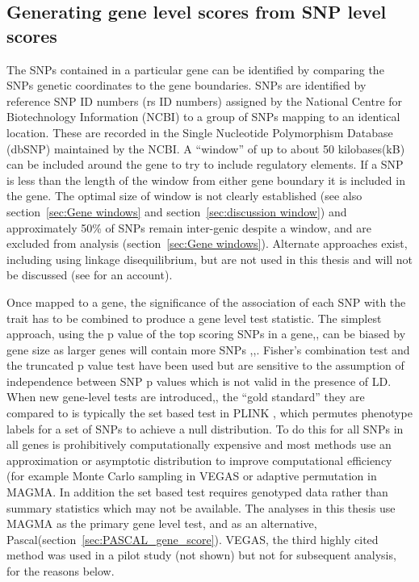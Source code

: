 \subsection{Generating gene level scores from SNP level scores}
\label{sec:Gene level scores fron SNP level scores}

The SNPs contained in a particular gene can be identified by comparing the SNPs genetic coordinates to the gene boundaries.
SNPs are identified by reference SNP ID numbers (rs ID numbers) assigned by the National Centre for Biotechnology Information (NCBI) to a group of SNPs mapping to an identical location. These are recorded in the Single Nucleotide Polymorphism Database (dbSNP) maintained by the NCBI\cite{kitts2002single}.   A ``window'' of up to about 50 kilobases(kB) can be included around the gene to try to include regulatory elements. If a SNP is less than the length of the window from either gene boundary it is included in the gene. The optimal size of window is not clearly established \cite{petersen2013assessing} (see also section~\ref{sec:Gene windows} and section~\ref{sec:discussion window}) and approximately 50\% of SNPs remain inter-genic despite a window, and are excluded from analysis (section~\ref{sec:Gene windows}). Alternate approaches exist, including using linkage disequilibrium, but are not used in this thesis and will not be discussed (see \cite{way2017implicating} for an account).

Once mapped to a gene, the significance  of the association of each SNP with the trait has  to be combined to produce a gene level test statistic. The simplest approach, using the p value of the top scoring SNPs in a gene\cite{wang2007pathway},\cite{holmans2009gene}, can be biased by gene size as larger genes will contain more SNPs \cite{wang2007pathway},\cite{elbers2009using},\cite{petersen2013assessing}. Fisher's combination test\cite{curtis2008simple} and the truncated p value test\cite{yang2009genome} have been used but are sensitive to the assumption of independence between SNP p values which is not valid in the presence of LD\cite{li2011gates}.
When new gene-level tests are introduced\cite{liu2010versatile},\cite{de2015magma},\cite{lamparter2016fast} the ``gold standard'' they are compared to is typically  the set based test in PLINK \cite{purcell2007plink}, which permutes phenotype labels for a set of SNPs to achieve a null distribution. To do this for all SNPs in all genes is prohibitively computationally expensive and most methods use an approximation or asymptotic distribution to improve computational efficiency (for example Monte Carlo sampling in VEGAS  or adaptive permutation in MAGMA. In addition the set based test requires genotyped data rather than summary statistics which may not be available. The analyses in this thesis use MAGMA \cite{de2015magma} as the primary gene level test, and as an alternative, Pascal\cite{lamparter2016fast}(section~\ref{sec:PASCAL_gene_score}). VEGAS, the third highly cited method  was used in a pilot study (not shown)\cite{liu2010versatile} but not for subsequent analysis, for the reasons below.  


